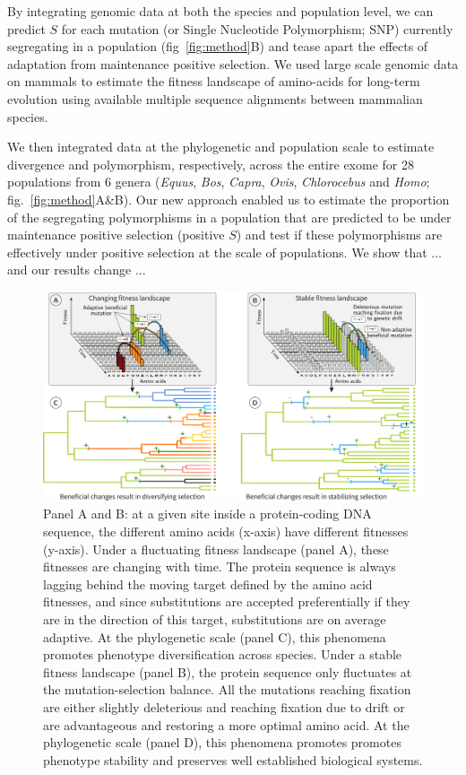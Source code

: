 \documentclass{article}
\newcommand{\Sphy}{S}
\begin{document}
    By integrating genomic data at both the species and population level, we can predict $\Sphy$ for each mutation (or Single Nucleotide Polymorphism; SNP) currently segregating in a population (fig~\ref{fig:method}B) and tease apart the effects of adaptation from maintenance positive selection.
    We used large scale genomic data on mammals to estimate the fitness landscape of amino-acids for long-term evolution using available multiple sequence alignments between mammalian species\cite{ranwez_orthomam_2007, howe_ensembl_2021}.

    We then integrated data at the phylogenetic and population scale to estimate divergence and polymorphism, respectively, across the entire exome for 28 populations from 6 genera (\textit{Equus},  \textit{Bos}, \textit{Capra}, \textit{Ovis}, \textit{Chlorocebus} and \textit{Homo}; fig.~\ref{fig:method}A\&B).
    Our new approach enabled us to estimate the proportion of the segregating polymorphisms in a population that are predicted to be under maintenance positive selection (positive $\Sphy$) and test if these polymorphisms are effectively under positive selection at the scale of populations.
    We show that ... and our results change ...

    \begin{figure}[!ht]
        \centering
        \includegraphics[width=\textwidth, page=1] {artworks/figure.fitness-landscape}
        \caption{
            Panel A and B: at a given site inside a protein-coding DNA sequence, the different amino acids (x-axis) have different fitnesses (y-axis).
            Under a fluctuating fitness landscape (panel A), these fitnesses are changing with time.
            The protein sequence is always lagging behind the moving target defined by the amino acid fitnesses, and since substitutions are accepted preferentially if they are in the direction of this target, substitutions are on average adaptive.
            At the phylogenetic scale (panel C), this phenomena promotes phenotype diversification across species.
            Under a stable fitness landscape (panel B), the protein sequence only fluctuates at the mutation-selection balance.
            All the mutations reaching fixation are either slightly deleterious and reaching fixation due to drift or are advantageous and restoring a more optimal amino acid.
            At the phylogenetic scale (panel D), this phenomena promotes promotes phenotype stability and preserves well established biological systems.
        }
        \label{fig:fitness-landscape}
    \end{figure}
\end{document}
